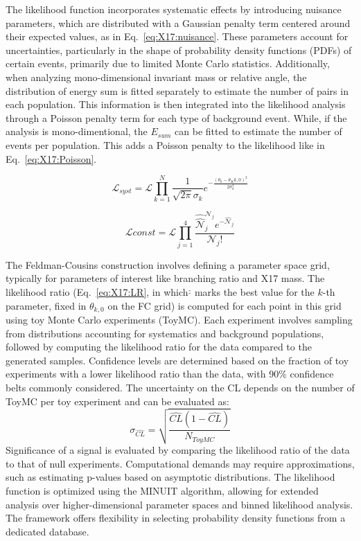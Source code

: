 \begin{refsection}
        \noindent
        The likelihood function incorporates systematic effects by introducing nuisance parameters, which are distributed with a Gaussian penalty term centered around their expected values, as in Eq.~\ref{eq:X17:nuisance}. 
        These parameters account for uncertainties, particularly in the shape of probability density functions (PDFs) of certain events, primarily due to limited Monte Carlo statistics. Additionally, when analyzing mono-dimensional invariant mass or relative angle, the distribution of energy sum is fitted separately to estimate the number of pairs in each population. This information is then integrated into the likelihood analysis through a Poisson penalty term for each type of background event.
        While, if the analysis is mono-dimentional, the $E_{sum}$ can be fitted to estimate the number of events per population.
        This adds a Poisson penalty to the likelihood like in Eq.~\ref{eq:X17:Poisson}.
        
        
        \begin{equation}
        \label{eq:X17:nuisance}
            \mathcal{L}_{syst} = \mathcal{L} \prod_{k=1}^N \frac{1}{\sqrt{2\pi}\sigma_k} e^{-\frac{(\theta_k-\theta_K{k,0})^2}{2\sigma_k^2}}
        \end{equation}

        \begin{equation}
        \label{eq:X17:Poisson}
            \mathcal{L}{const} = \mathcal{L} \prod_{j=1}^4 \frac{\hat{\hat{\mathcal{N}}}_j^{\mathcal{N}_j}e^{-\hat{\mathcal{N}}_j}}{\mathcal{N}_j!}
        \end{equation}

        \noindent
        The Feldman-Cousins construction involves defining a parameter space grid, typically for parameters of interest like branching ratio and X17 mass. 
        The likelihood ratio (Eq.~\ref{eq:X17:LR}, in which $\hat{\hat{}}$ marks the best value for the $k$-th parameter, fixed in $\theta_{k,0}$ on the FC grid) is computed for each point in this grid using toy Monte Carlo experiments (ToyMC). 
        Each experiment involves sampling from distributions accounting for systematics and background populations, followed by computing the likelihood ratio for the data compared to the generated samples. 
        Confidence levels are determined based on the fraction of toy experiments with a lower likelihood ratio than the data, with 90\% confidence belts commonly considered. 
        The uncertainty on the CL depends on the number of ToyMC per toy experiment and can be evaluated as:
        $$\sigma_{\hat{CL}} = \sqrt{\frac{\hat{CL}(1-\hat{CL})}{N_{ToyMC}}}$$
        Significance of a signal is evaluated by comparing the likelihood ratio of the data to that of null experiments. 
        Computational demands may require approximations, such as estimating p-values based on asymptotic distributions. 
        The likelihood function is optimized using the MINUIT algorithm, allowing for extended analysis over higher-dimensional parameter spaces and binned likelihood analysis. 
        The framework offers flexibility in selecting probability density functions from a dedicated database.


\end{refsection}
